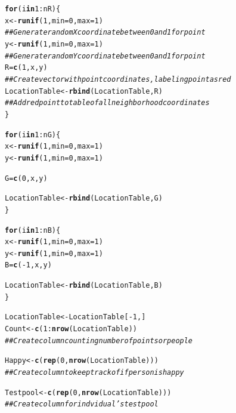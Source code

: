 \documentclass{article}\usepackage[]{graphicx}\usepackage[]{color}
\makeatletter
\newcommand{\hlnum}[1]{\textcolor[rgb]{0.686,0.059,0.569}{#1}}%
\newcommand{\hlcom}[1]{\textcolor[rgb]{0.678,0.584,0.686}{\textit{#1}}}%
\newcommand{\hlopt}[1]{\textcolor[rgb]{0,0,0}{#1}}%
\newcommand{\hlstd}[1]{\textcolor[rgb]{0.345,0.345,0.345}{#1}}%
\newcommand{\hlkwa}[1]{\textcolor[rgb]{0.161,0.373,0.58}{\textbf{#1}}}%
\newcommand{\hlkwb}[1]{\textcolor[rgb]{0.69,0.353,0.396}{#1}}%
\newcommand{\hlkwc}[1]{\textcolor[rgb]{0.333,0.667,0.333}{#1}}%
\newcommand{\hlkwd}[1]{\textcolor[rgb]{0.737,0.353,0.396}{\textbf{#1}}}%
\newenvironment{kframe}{%
 \def\at@end@of@kframe{}%
 \ifinner\ifhmode%
  \def\at@end@of@kframe{\end{minipage}}%
  \begin{minipage}{\columnwidth}%
 \fi\fi%
 \def\FrameCommand##1{\hskip\@totalleftmargin \hskip-\fboxsep
 \colorbox{shadecolor}{##1}\hskip-\fboxsep
     \hskip-\linewidth \hskip-\@totalleftmargin \hskip\columnwidth}%
 \MakeFramed {\advance\hsize-\width
   \@totalleftmargin\z@ \linewidth\hsize
   \@setminipage}}%
 {\par\unskip\endMakeFramed%
 \at@end@of@kframe}
\newenvironment{knitrout}{}{} %
\makeatother
\begin{document}
\begin{knitrout}
\begin{kframe}
\begin{alltt}
  \hlkwa{for} \hlstd{(i} \hlkwa{in} \hlnum{1}\hlopt{:}\hlstd{nR)\{}
    \hlstd{x} \hlkwb{<-} \hlkwd{runif}\hlstd{(}\hlnum{1}\hlstd{,} \hlkwc{min}\hlstd{=}\hlnum{0}\hlstd{,} \hlkwc{max}\hlstd{=}\hlnum{1}\hlstd{)}
    \hlcom{## Generate random X coordinate between 0 and 1 for point}
    \hlstd{y} \hlkwb{<-} \hlkwd{runif}\hlstd{(}\hlnum{1}\hlstd{,} \hlkwc{min}\hlstd{=}\hlnum{0}\hlstd{,} \hlkwc{max}\hlstd{=}\hlnum{1}\hlstd{)}
    \hlcom{## Generate random Y coordinate between 0 and 1 for point}
    \hlstd{R} \hlkwb{=} \hlkwd{c}\hlstd{(}\hlnum{1}\hlstd{,x,y)}
    \hlcom{## Create vector with point coordinates, labeling point as red}
    \hlstd{LocationTable} \hlkwb{<-} \hlkwd{rbind}\hlstd{(LocationTable, R)}
    \hlcom{## Add red point to table of all neighborhood coordinates}
  \hlstd{\}}

  \hlkwa{for} \hlstd{(i} \hlkwa{in} \hlnum{1}\hlopt{:}\hlstd{nG)\{}
    \hlstd{x} \hlkwb{<-} \hlkwd{runif}\hlstd{(}\hlnum{1}\hlstd{,} \hlkwc{min}\hlstd{=}\hlnum{0}\hlstd{,} \hlkwc{max}\hlstd{=}\hlnum{1}\hlstd{)}
    \hlstd{y} \hlkwb{<-} \hlkwd{runif}\hlstd{(}\hlnum{1}\hlstd{,} \hlkwc{min}\hlstd{=}\hlnum{0}\hlstd{,} \hlkwc{max}\hlstd{=}\hlnum{1}\hlstd{)}

    \hlstd{G} \hlkwb{=} \hlkwd{c}\hlstd{(}\hlnum{0}\hlstd{,x,y)}

    \hlstd{LocationTable} \hlkwb{<-} \hlkwd{rbind}\hlstd{(LocationTable, G)}
  \hlstd{\}}

  \hlkwa{for} \hlstd{(i} \hlkwa{in} \hlnum{1}\hlopt{:}\hlstd{nB)\{}
    \hlstd{x} \hlkwb{<-} \hlkwd{runif}\hlstd{(}\hlnum{1}\hlstd{,} \hlkwc{min}\hlstd{=}\hlnum{0}\hlstd{,} \hlkwc{max}\hlstd{=}\hlnum{1}\hlstd{)}
    \hlstd{y} \hlkwb{<-} \hlkwd{runif}\hlstd{(}\hlnum{1}\hlstd{,} \hlkwc{min}\hlstd{=}\hlnum{0}\hlstd{,} \hlkwc{max}\hlstd{=}\hlnum{1}\hlstd{)}
    \hlstd{B} \hlkwb{=} \hlkwd{c}\hlstd{(}\hlopt{-}\hlnum{1}\hlstd{,x,y)}

    \hlstd{LocationTable} \hlkwb{<-} \hlkwd{rbind}\hlstd{(LocationTable, B)}
  \hlstd{\}}

  \hlstd{LocationTable} \hlkwb{<-} \hlstd{LocationTable[}\hlopt{-}\hlnum{1}\hlstd{,]}
  \hlstd{Count} \hlkwb{<-} \hlkwd{c}\hlstd{(}\hlnum{1}\hlopt{:}\hlkwd{nrow}\hlstd{(LocationTable))}
  \hlcom{## Create column counting number of points or people}

  \hlstd{Happy} \hlkwb{<-} \hlkwd{c}\hlstd{(}\hlkwd{rep}\hlstd{(}\hlnum{0}\hlstd{,} \hlkwd{nrow}\hlstd{(LocationTable)))}
  \hlcom{## Create column to keep track of if person is happy}

  \hlstd{Testpool} \hlkwb{<-} \hlkwd{c}\hlstd{(}\hlkwd{rep}\hlstd{(}\hlnum{0}\hlstd{,} \hlkwd{nrow}\hlstd{(LocationTable)))}
  \hlcom{## Create column for indvidual's testpool}


\end{alltt}
\end{kframe}
\end{knitrout}
\end{document}
